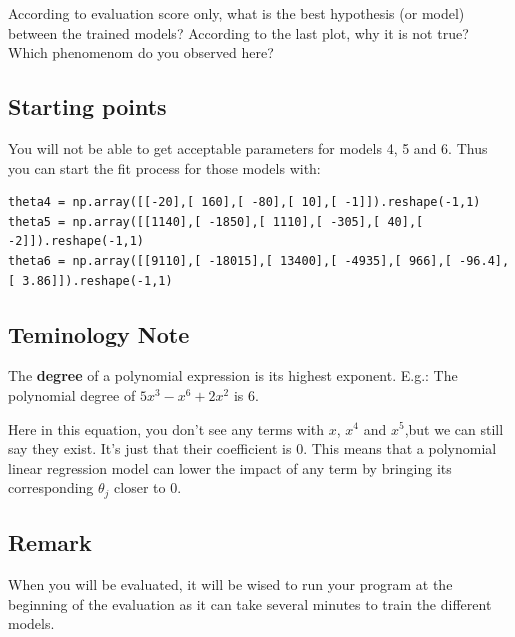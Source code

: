 \documentclass{42-en}
\begin{document}
According to evaluation score only, what is the best hypothesis (or model) between the trained models?
According to the last plot, why it is not true?
Which phenomenom do you observed here?

\subsection*{Starting points}
You will not be able to get acceptable parameters for models 4, 5 and 6.
Thus you can start the fit process for those models with:

\begin{verbatim}
theta4 = np.array([[-20],[ 160],[ -80],[ 10],[ -1]]).reshape(-1,1)
theta5 = np.array([[1140],[ -1850],[ 1110],[ -305],[ 40],[ -2]]).reshape(-1,1)
theta6 = np.array([[9110],[ -18015],[ 13400],[ -4935],[ 966],[ -96.4],[ 3.86]]).reshape(-1,1)
\end{verbatim}

\subsection*{Teminology Note}
The \textbf{degree} of a polynomial expression is its highest exponent.  
E.g.: The polynomial degree of $5x^3 - x^6 + 2 x^2$ is $6$.  


Here in this equation, you don't see any terms with $x$, $x^4$ and $x^5$,but we can still say they exist. It's just that their coefficient is $0$.
This means that a polynomial linear regression model can lower the impact of any term by bringing its corresponding $\theta_j$ closer to $0$.

\subsection*{Remark}
When you will be evaluated, it will be wised to run your program at the beginning of the evaluation as it can take several minutes to train the different models.


\newpage

\end{document}
